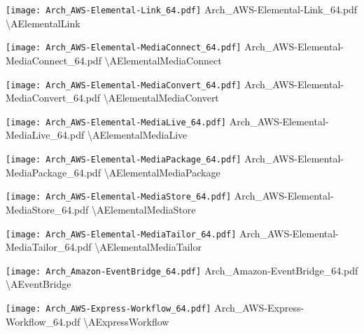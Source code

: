  {\texttt{[image: Arch\_AWS-Elemental-Link\_64.pdf]}} {Arch\_AWS-Elemental-Link\_64.pdf} {{\textbackslash}AElementalLink}

 {\texttt{[image: Arch\_AWS-Elemental-MediaConnect\_64.pdf]}} {Arch\_AWS-Elemental-MediaConnect\_64.pdf} {{\textbackslash}AElementalMediaConnect}

 {\texttt{[image: Arch\_AWS-Elemental-MediaConvert\_64.pdf]}} {Arch\_AWS-Elemental-MediaConvert\_64.pdf} {{\textbackslash}AElementalMediaConvert}

 {\texttt{[image: Arch\_AWS-Elemental-MediaLive\_64.pdf]}} {Arch\_AWS-Elemental-MediaLive\_64.pdf} {{\textbackslash}AElementalMediaLive}

 {\texttt{[image: Arch\_AWS-Elemental-MediaPackage\_64.pdf]}} {Arch\_AWS-Elemental-MediaPackage\_64.pdf} {{\textbackslash}AElementalMediaPackage}

 {\texttt{[image: Arch\_AWS-Elemental-MediaStore\_64.pdf]}} {Arch\_AWS-Elemental-MediaStore\_64.pdf} {{\textbackslash}AElementalMediaStore}

 {\texttt{[image: Arch\_AWS-Elemental-MediaTailor\_64.pdf]}} {Arch\_AWS-Elemental-MediaTailor\_64.pdf} {{\textbackslash}AElementalMediaTailor}

 {\texttt{[image: Arch\_Amazon-EventBridge\_64.pdf]}} {Arch\_Amazon-EventBridge\_64.pdf} {{\textbackslash}AEventBridge}

 {\texttt{[image: Arch\_AWS-Express-Workflow\_64.pdf]}} {Arch\_AWS-Express-Workflow\_64.pdf} {{\textbackslash}AExpressWorkflow}

